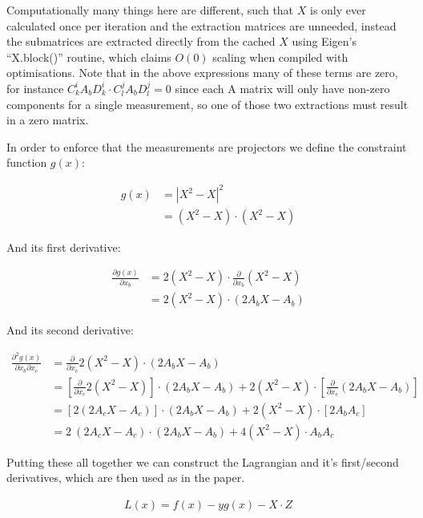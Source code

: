\documentclass{article}
\begin{document}
Computationally many things here are different, such that $X$ is only ever calculated once per iteration and the extraction matrices are unneeded, instead the submatrices are extracted directly from the cached $X$ using Eigen's ``X.block()'' routine, which claims $O(0)$ scaling when compiled with optimisations. Note that in the above expressions many of these terms are zero, for instance $C_k^i A_b D_k^i \cdot C_l^j A_b D_l^j = 0$ since each A matrix will only have non-zero components for a single measurement, so one of those two extractions must result in a zero matrix.

In order to enforce that the measurements are projectors we define the constraint function $g(x)$:

\begin{align}
	g(x) &= |X^2 - X|^2 \\
		 &= (X^2 - X) \cdot (X^2 - X)
\end{align}

And its first derivative:

\begin{align}
	\frac{\partial g(x)}{\partial x_b} &= 2 (X^2 - X) \cdot \frac{\partial }{\partial x_b} (X^2 - X)  \\
									   &= 2 (X^2 - X) \cdot (2 A_b X - A_b)
\end{align}

And its second derivative:

\begin{align}
\frac{\partial^2 g(x)}{\partial x_b \partial x_c} &= \frac{\partial}{\partial x_c} 2 (X^2 - X) \cdot (2 A_b X - A_b) \\
												  &= \left[ \frac{\partial}{\partial x_c} 2 (X^2 - X) \right] \cdot (2 A_b X - A_b) +  2 (X^2 - X) \cdot \left[ \frac{\partial}{\partial x_c} (2 A_b X - A_b) \right] \\
												  &= \left[ 2 (2 A_c X - A_c) \right] \cdot (2 A_b X - A_b) +  2 (X^2 - X) \cdot \left[ 2 A_b A_c \right] \\
												  &= 2 ~ (2 A_c X - A_c) \cdot (2 A_b X - A_b) +  4 (X^2 - X) \cdot A_b A_c 
\end{align}

Putting these all together we can construct the Lagrangian and it's first/second derivatives, which are then used as in the paper.

\begin{align}
	L(x) = f(x) - y g(x) - X \cdot Z
\end{align}
\end{document}
